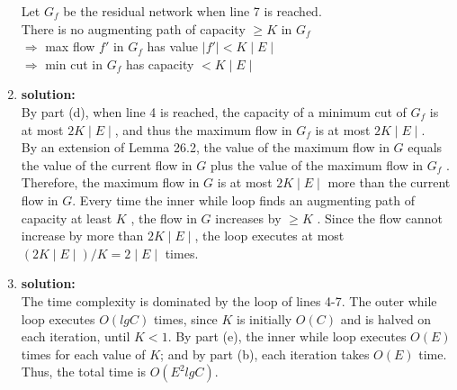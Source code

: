 \begin{enumerate}[label=(\alph*)]
	Let $G_f$ be the residual network when line 7 is reached.\\
	There is no augmenting path of capacity $\geq K$ in $G_f$\\
	$\Rightarrow$ max flow $f'$ in $G_f$ has value $\mid f' \mid < K \mid E \mid$\\
	$\Rightarrow$ min cut in $G_f$ has capacity $< K \mid E \mid$ 

	\item \textbf{solution:}\\
	By part (d), when line 4 is reached, the capacity of a minimum cut of $G_f$ is at most $2K \mid E \mid$, and thus the maximum flow in $G_f$ is at most $2K \mid E \mid$.\\

	By an extension of Lemma 26.2, the value of the maximum flow in $G$ equals the value of the current flow in $G$ plus the value of the maximum flow in $G_f$ . Therefore, the maximum flow in $G$ is at most $2K \mid E \mid$ more than the current flow in $G$. Every time the inner while loop finds an augmenting path of capacity at least $K$ , the flow in $G$ increases by $\geq K$ . Since the flow cannot increase by more than $2K \mid E \mid$, the loop executes at most $(2K \mid E \mid)/K = 2 \mid E \mid$ times.

	\item \textbf{solution:}\\
	The time complexity is dominated by the loop of lines 4-7. The outer while loop executes $O(lgC)$ times, since $K$ is initially $O(C)$ and is halved on each iteration, until $K < 1$. By part (e), the inner while loop executes $O(E)$ times for each value of $K$; and by part (b), each iteration takes $O(E)$ time. Thus, the total time is $O(E^2 lg C)$.
\end{enumerate}